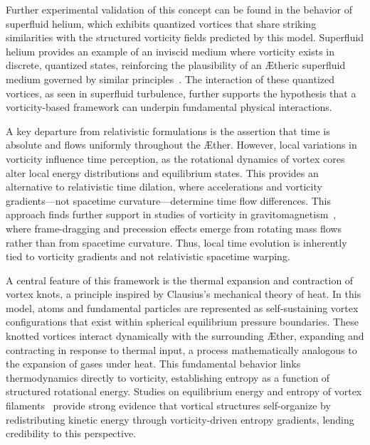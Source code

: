 Further experimental validation of this concept can be found in the behavior of superfluid helium, which exhibits quantized vortices that share striking similarities with the structured vorticity fields predicted by this model.
Superfluid helium provides an example of an inviscid medium where vorticity exists in discrete, quantized states, reinforcing the plausibility of an Ætheric superfluid medium governed by similar principles~\cite{vinen2002}.
The interaction of these quantized vortices, as seen in superfluid turbulence, further supports the hypothesis that a vorticity-based framework can underpin fundamental physical interactions.

A key departure from relativistic formulations is the assertion that time is absolute and flows uniformly throughout the Æther.
However, local variations in vorticity influence time perception, as the rotational dynamics of vortex cores alter local energy distributions and equilibrium states.
This provides an alternative to relativistic time dilation, where accelerations and vorticity gradients—not spacetime curvature—determine time flow differences.
This approach finds further support in studies of vorticity in gravitomagnetism~\cite{cahill2005}, where frame-dragging and precession effects emerge from rotating mass flows rather than from spacetime curvature.
Thus, local time evolution is inherently tied to vorticity gradients and not relativistic spacetime warping.

A central feature of this framework is the thermal expansion and contraction of vortex knots, a principle inspired by Clausius’s mechanical theory of heat.
In this model, atoms and fundamental particles are represented as self-sustaining vortex configurations that exist within spherical equilibrium pressure boundaries.
These knotted vortices interact dynamically with the surrounding Æther, expanding and contracting in response to thermal input, a process mathematically analogous to the expansion of gases under heat.
This fundamental behavior links thermodynamics directly to vorticity, establishing entropy as a function of structured rotational energy.
Studies on equilibrium energy and entropy of vortex filaments~\cite{belik2023} provide strong evidence that vortical structures self-organize by redistributing kinetic energy through vorticity-driven entropy gradients, lending credibility to this perspective.

